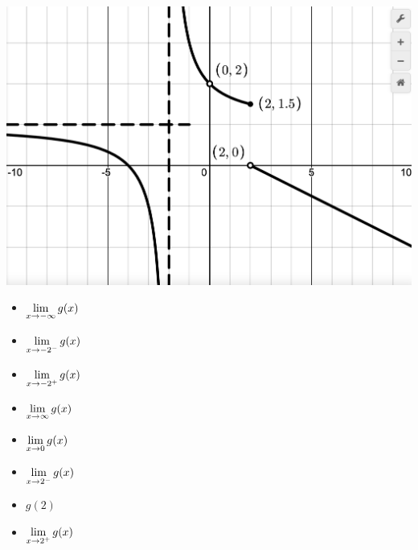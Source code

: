 \begin{enumerate}
\begin{center}
\includegraphics[width=5.5in]{./IntroLimitsGraphics/M2500_T01_Sp25_a.png}

\end{center}

\bigskip

\begin{multicols}{4}

\begin{itemize}

\item $\displaystyle{\lim_{x \rightarrow -\infty} g(x)}$

\item $\displaystyle{\lim_{x \rightarrow -2^{-}} g(x)}$

\item $\displaystyle{\lim_{x \rightarrow -2^{+}} g(x)}$

\item  $\displaystyle{\lim_{x \rightarrow \infty} g(x)}$

\end{itemize}

\end{multicols}

\bigskip

\begin{multicols}{4}

\begin{itemize}

\item $\displaystyle{\lim_{x \rightarrow 0} g(x)}$

\item $\displaystyle{\lim_{x \rightarrow 2^{-}} g(x)}$

\item  $g(2)$

\item $\displaystyle{\lim_{x \rightarrow 2^{+}} g(x)}$
\end{itemize}

\end{multicols}

\bigskip

\setcounter{HW}{\value{enumi}}
\end{enumerate}

